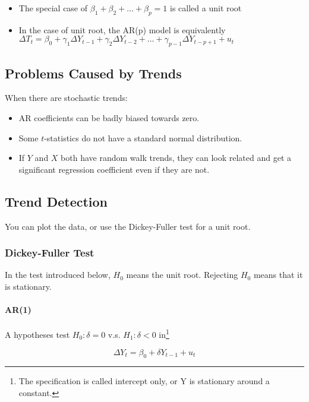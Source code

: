 \documentclass{article}
\begin{document}
\begin{itemize}
	\item The special case of $\beta_1 + \beta_2 + \ldots + \beta_p = 1$ is called a unit root
	\item In the case of unit root, the AR(p) model is equivalently
					$\Delta T_t = \beta_0 + \gamma_1 \Delta Y_{t-1} + \gamma_2 \Delta Y_{t-2} + \ldots + \gamma_{p-1} \Delta Y_{t-p+1} + u_t$
\end{itemize}

\subsection{Problems Caused by Trends}

When there are stochastic trends:

\begin{itemize}
	\item AR coefficients can be badly biased towards zero.
	\item Some $t$-statistics do not have a standard normal distribution.
	\item If $Y$ and $X$ both have random walk trends, they can look related and get a significant regression coefficient
					even if they are not.
\end{itemize}

\subsection{Trend Detection}

You can plot the data, or use the Dickey-Fuller test for a unit root.

\subsubsection{Dickey-Fuller Test}

In the test introduced below, $H_0$ means the unit root. Rejecting $H_0$ means that it is stationary.

\paragraph{AR(1)}

A hypotheses test $H_0: \delta = 0$ v.s. $H_1: \delta < 0$
in\footnote{The specification is called intercept only, or Y is stationary around a constant.}

\[
	\Delta Y_t = \beta_0 + \delta Y_{t-1} + u_t
\]
\end{document}
